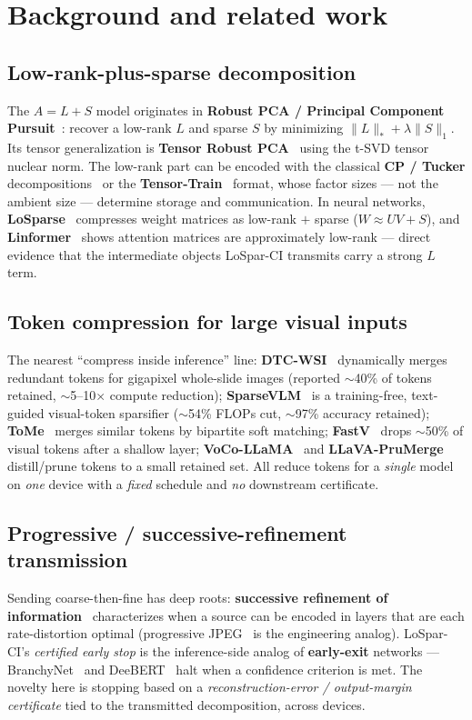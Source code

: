 \documentclass[11pt]{article}
\newcommand{\term}[1]{\textbf{\color{accent!85!black}#1}}
\newcommand{\norm}[1]{\lVert #1 \rVert}
\begin{document}
\section{Background and related work}

\subsection{Low-rank-plus-sparse decomposition}
The $A=L+S$ model originates in \term{Robust PCA / Principal Component
Pursuit}~\cite{rpca}: recover a low-rank $L$ and sparse $S$ by minimizing
$\norm{L}_* + \lambda\norm{S}_1$. Its tensor generalization is \term{Tensor Robust
PCA}~\cite{trpca_cvpr,trpca_pami} using the t-SVD tensor nuclear norm. The low-rank part can
be encoded with the classical \term{CP / Tucker} decompositions~\cite{kolda} or the
\term{Tensor-Train}~\cite{tt} format, whose factor sizes --- not the ambient size ---
determine storage and communication. In neural networks, \term{LoSparse}~\cite{losparse}
compresses weight matrices as low-rank $+$ sparse ($W\approx UV + S$), and
\term{Linformer}~\cite{linformer} shows attention matrices are approximately low-rank ---
direct evidence that the intermediate objects LoSpar-CI transmits carry a strong $L$ term.

\subsection{Token compression for large visual inputs}
\label{sec:tokencomp}
The nearest ``compress inside inference'' line: \term{DTC-WSI}~\cite{dtcwsi} dynamically merges
redundant tokens for gigapixel whole-slide images (reported $\sim$40\% of tokens retained,
$\sim$5--10$\times$ compute reduction); \term{SparseVLM}~\cite{sparsevlm} is a training-free,
text-guided visual-token sparsifier ($\sim$54\% FLOPs cut, $\sim$97\% accuracy retained);
\term{ToMe}~\cite{tome} merges similar tokens by bipartite soft matching;
\term{FastV}~\cite{fastv} drops $\sim$50\% of visual tokens after a shallow layer;
\term{VoCo-LLaMA}~\cite{vocollama} and \term{LLaVA-PruMerge}~\cite{prumerge} distill/prune
tokens to a small retained set. All reduce tokens for a \emph{single} model on \emph{one}
device with a \emph{fixed} schedule and \emph{no} downstream certificate.

\subsection{Progressive / successive-refinement transmission}
Sending coarse-then-fine has deep roots: \term{successive refinement of
information}~\cite{equitzcover} characterizes when a source can be encoded in layers that are
each rate-distortion optimal (progressive JPEG~\cite{jpeg} is the engineering analog).
LoSpar-CI's \emph{certified early stop} is the inference-side analog of \term{early-exit}
networks --- BranchyNet~\cite{branchynet} and DeeBERT~\cite{deebert} halt when a confidence
criterion is met. The novelty here is stopping based on a \emph{reconstruction-error /
output-margin certificate} tied to the transmitted decomposition, across devices.
\end{document}
